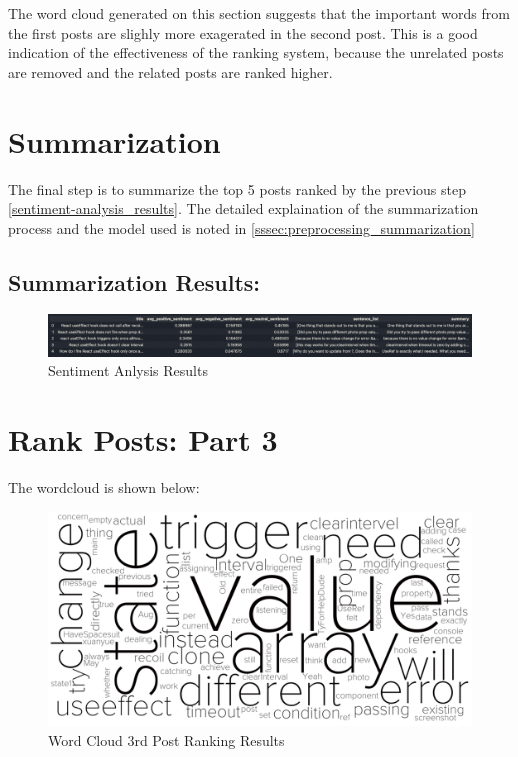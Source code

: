 \noindent The word cloud generated on this section suggests that the important words from the first posts are slighly more exagerated in the second post. This is a good indication of the effectiveness of the ranking system, because the unrelated posts are removed and the related posts are ranked higher.

\section{Summarization} \label{summarization_results}
The final step is to summarize the top 5 posts ranked by the previous step \ref{sentiment-analysis_results}. The detailed explaination of the summarization process and the model used is noted in \ref{sssec:preprocessing_summarization}

\subsection{Summarization Results:} \label{summarization_results}
\begin{figure}[H]
  \centering
  \includegraphics[scale=0.50, angle=90]{assets/summarization.png}
  \caption{Sentiment Anlysis Results}
  \label{fig:summarization}
\end{figure}

\section{Rank Posts: Part 3} \label{rank-posts_3_results}
The wordcloud is shown below:

\begin{figure}[H]
  \centering
  \includegraphics[scale=0.35]{assets/rank_post_3.png}
  \caption{Word Cloud 3rd Post Ranking  Results}
  \label{fig:rank_post_3_wc}
\end{figure}

